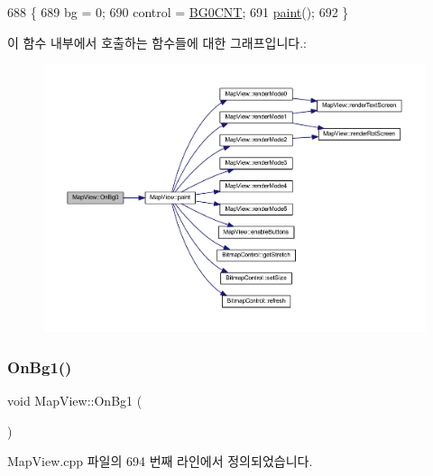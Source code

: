 \begin{DoxyCode}
688 \{
689   bg = 0;
690   control = \mbox{\hyperlink{_globals_8cpp_a6b479219dfffa1ef8c5f2884384b579e}{BG0CNT}};
691   \mbox{\hyperlink{class_map_view_a89edf3053cffa4a68516178dbd987339}{paint}}();
692 \}
\end{DoxyCode}
이 함수 내부에서 호출하는 함수들에 대한 그래프입니다.\+:
\nopagebreak
\begin{figure}[H]
\begin{center}
\leavevmode
\includegraphics[width=350pt]{class_map_view_a63d587842197ce259cfcf9cfd29d0771_cgraph}
\end{center}
\end{figure}
\mbox{\label{class_map_view_a67a49b3a77fa0205f7729a391d45f26c}} 
\subsubsection{\texorpdfstring{On\+Bg1()}{OnBg1()}}
{\footnotesize\ttfamily void Map\+View\+::\+On\+Bg1 (\begin{DoxyParamCaption}{ }\end{DoxyParamCaption})\hspace{0.3cm}{\ttfamily [protected]}}



Map\+View.\+cpp 파일의 694 번째 라인에서 정의되었습니다.


